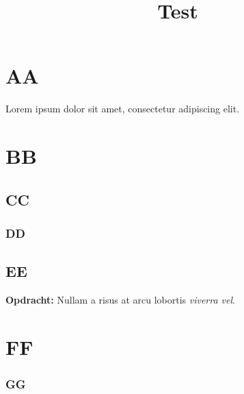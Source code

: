 \documentclass{article}
\title{Test}
\begin{document}
	\section{AA}
	Lorem ipsum dolor sit amet,
	consectetur adipiscing elit.

	\section{BB}
	\subsection{CC}
	\subsubsection{DD}
	\subsection{EE}
	\textbf{Opdracht:} Nullam
	a risus at arcu lobortis
	\textit{viverra vel}.

	\section{FF}
	\subsubsection{GG}
\end{document}
